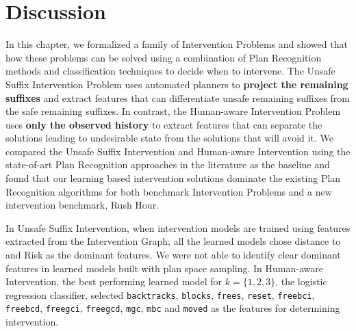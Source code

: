 \section{Discussion}
\label{sec:discussion}
In this chapter, we formalized a family of Intervention Problems and showed that how these problems can be solved using a combination of Plan Recognition methods and classification techniques to decide when to intervene.
The Unsafe Suffix Intervention Problem uses automated planners to \textbf{project the remaining suffixes} and extract features that can differentiate unsafe remaining suffixes from the safe remaining suffixes. 
In contrast, the Human-aware Intervention Problem uses \textbf{only the observed history \historyDef} to extract features that can separate the solutions leading to undesirable state from the solutions that will avoid it.
We compared the Unsafe Suffix Intervention and Human-aware Intervention using the state-of-art Plan Recognition approaches in the literature as the baseline and found that our learning based intervention solutions dominate the existing Plan Recognition algorithms for both benchmark Intervention Problems and a new intervention benchmark, Rush Hour.

In Unsafe Suffix Intervention, when intervention models are trained using features extracted from the Intervention Graph, all the learned models chose distance to \undesired and Risk as the dominant features. We were not able to identify clear dominant features in learned models built with plan space sampling. 
In Human-aware Intervention, the best performing learned model for $k=\lbrace 1,2,3\rbrace$, the logistic regression classifier, selected  \texttt{backtracks}, \texttt{blocks}, \texttt{frees}, \texttt{reset}, \texttt{freebci}, \texttt{freebcd}, \texttt{freegci}, \texttt{freegcd}, \texttt{mgc}, \texttt{mbc} and \texttt{moved} as the features for determining intervention.

